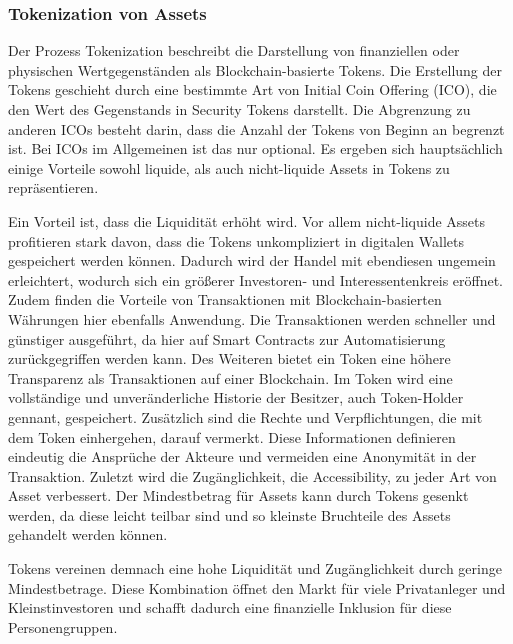 \subsubsection{Tokenization von Assets}
\label{sec:Tokenization}
Der Prozess \glqq Tokenization\grqq{} beschreibt die Darstellung von finanziellen oder physischen
Wertgegenständen als Blockchain-basierte Tokens. Die Erstellung der Tokens geschieht durch 
eine bestimmte Art von Initial Coin Offering (ICO), die den Wert des Gegenstands in Security Tokens 
darstellt.
\cite[p.~82]{gupta2020tokenization}
Die Abgrenzung zu anderen ICOs besteht darin, dass die Anzahl der Tokens von Beginn an begrenzt ist.
Bei ICOs im Allgemeinen ist das nur optional.
\cite[p.66]{fill2020blockchain}
Es ergeben sich hauptsächlich einige Vorteile sowohl liquide, als auch nicht-liquide Assets in Tokens zu 
repräsentieren.

Ein Vorteil ist, dass die Liquidität erhöht wird.
Vor allem nicht-liquide Assets profitieren stark davon, dass die Tokens unkompliziert in digitalen
Wallets gespeichert werden können. Dadurch wird der Handel mit ebendiesen ungemein erleichtert, wodurch
sich ein grö\ss erer Investoren- und Interessentenkreis eröffnet.
Zudem finden die Vorteile von Transaktionen mit Blockchain-basierten Währungen hier ebenfalls Anwendung.
Die Transaktionen werden schneller und günstiger ausgeführt, da hier auf Smart Contracts zur 
Automatisierung zurückgegriffen werden kann. 
Des Weiteren bietet ein Token eine höhere Transparenz als Transaktionen auf einer Blockchain.
Im Token wird eine vollständige und unveränderliche Historie der Besitzer, auch Token-Holder gennant,
gespeichert. Zusätzlich sind die Rechte und Verpflichtungen, die mit dem Token einhergehen, darauf 
vermerkt.
Diese Informationen definieren eindeutig die Ansprüche der Akteure und vermeiden eine Anonymität in
der Transaktion.
Zuletzt wird die Zugänglichkeit, die Accessibility, zu jeder Art von Asset verbessert. 
Der Mindestbetrag für Assets kann durch Tokens gesenkt werden, da diese leicht teilbar sind und so 
kleinste Bruchteile des Assets gehandelt werden können.
\cite[p.~82]{gupta2020tokenization}

Tokens vereinen demnach eine hohe Liquidität und Zugänglichkeit durch geringe Mindestbetrage.
Diese Kombination öffnet den Markt für viele Privatanleger und Kleinstinvestoren und schafft dadurch
eine finanzielle Inklusion für diese Personengruppen.
\cite[p.~167]{chowdhary2025smart}





